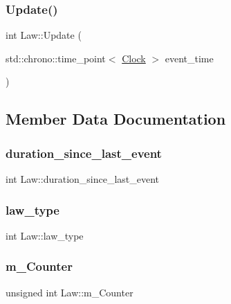 \subsubsection{\texorpdfstring{Update()}{Update()}}
{\footnotesize\ttfamily int Law\+::\+Update (\begin{DoxyParamCaption}\item[{std\+::chrono\+::time\+\_\+point$<$ \mbox{\hyperlink{universe_8h_a0ef8d951d1ca5ab3cfaf7ab4c7a6fd80}{Clock}} $>$}]{event\+\_\+time }\end{DoxyParamCaption})}



\subsection{Member Data Documentation}
\mbox{\label{classLaw_a347aff85a02895946ff97718afdfeeff}} 
\subsubsection{\texorpdfstring{duration\+\_\+since\+\_\+last\+\_\+event}{duration\_since\_last\_event}}
{\footnotesize\ttfamily int Law\+::duration\+\_\+since\+\_\+last\+\_\+event\hspace{0.3cm}{\ttfamily [private]}}

\mbox{\label{classLaw_a89176462e467ae7fa48c9b9cce6e55b2}} 
\subsubsection{\texorpdfstring{law\+\_\+type}{law\_type}}
{\footnotesize\ttfamily int Law\+::law\+\_\+type\hspace{0.3cm}{\ttfamily [private]}}

\mbox{\label{classLaw_a5d0e4fe1c614b9dac57f5f0135148cd6}} 
\subsubsection{\texorpdfstring{m\+\_\+\+Counter}{m\_Counter}}
{\footnotesize\ttfamily unsigned int Law\+::m\+\_\+\+Counter\hspace{0.3cm}{\ttfamily [private]}}



